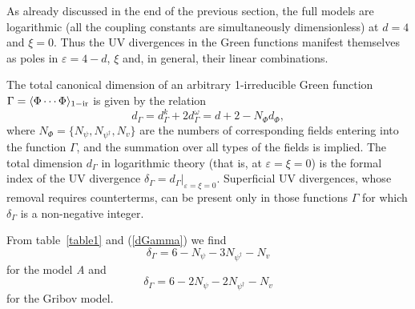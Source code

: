\documentclass[12pt]{article}
\begin{document}
As already discussed in the end of the previous section, the full models are
logarithmic (all the coupling constants are simultaneously dimensionless) at
$d=4$ and $\xi=0$. Thus the UV divergences in the Green functions manifest
themselves as poles in $\varepsilon = 4-d$, $\xi$ and, in general, their linear
combinations.

The total canonical dimension of an arbitrary 1-irreducible Green function
$\Gamma = \langle\Phi \cdots \Phi \rangle _{\rm 1-ir}$
is given by the relation \cite{Book3}
\begin{equation}
d_{\Gamma }=d_{\Gamma }^k+2d_{\Gamma }^{\omega }= d+2-N_{\Phi }d_{\Phi},
\label{dGamma}
\end{equation}
where $N_{\Phi}=\{N_{\psi},N_{\psi^{\dag}}, N_{v}\}$ are the numbers of
corresponding fields entering into the function $\Gamma$, and the summation
over all types of the fields is implied. The total dimension $d_{\Gamma}$
in logarithmic theory (that is, at $\varepsilon=\xi=0$) is the formal index of the
UV divergence $\delta_{\Gamma}=d_{\Gamma}|_{\varepsilon=\xi=0}$. Superficial UV
divergences, whose removal requires counterterms, can be present only in
those functions $\Gamma$ for which $\delta_{\Gamma}$ is a non-negative
integer.

From table~\ref{table1} and (\ref{dGamma}) we find
\begin{equation}
\delta_{\Gamma}= 6 - N_{\psi} - 3N_{\psi^{\dag}} - N_{v}
\label{IndeA}
\end{equation}
for the model {\it A} and
\begin{equation}
\delta_{\Gamma}= 6 - 2N_{\psi} - 2N_{\psi^{\dag}} - N_{v}
\label{IndeG}
\end{equation}
for the Gribov model.
\end{document}

